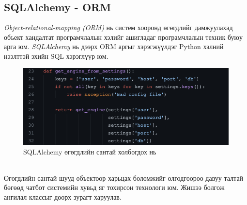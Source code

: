 \subsection{SQLAlchemy - ORM}
\textit{Object-relational-mapping (ORM)} нь систем хооронд өгөгдлийг дамжуулахад объект хандалтат програмчлалын хэлийг ашигладаг програмчлалын техник буюу арга юм. \textit{SQLAlchemy} нь дээрх ORM аргыг хэрэгжүүлдэг Python хэлний нээлттэй эхийн SQL хэрэглүүр юм. 
\begin{figure}[ht]
  \centering
  \includegraphics[height=5  cm]{images/connection.png}
  \caption{SQLAlchemy өгөгдлийн сантай холбогдох нь} \label{fig:connection}
\end{figure}
\\Өгөгдлийн сантай шууд объектоор харьцах боломжийг олгодгоороо давуу талтай бөгөөд чатбот системийн хувьд яг тохирсон технологи юм. Жишээ болгож ангилал классыг доорх зурагт харуулав.
 
